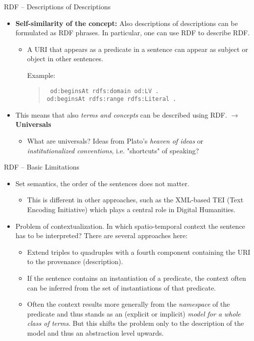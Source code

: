 \documentclass{beamer}
\begin{document}
\begin{frame}{RDF -- Descriptions of Descriptions}
\begin{itemize}
\item \textbf{Self-similarity of the concept:} Also descriptions of
  descriptions can be formulated as RDF phrases. In particular, one can use
  RDF to describe RDF.
  \begin{itemize}
  \item A URI that appears as a predicate in a sentence can appear as subject
    or object in other sentences.
  
    Example:
    \begin{quote}\tt      
      od:beginsAt rdfs:domain od:LV .\\
      od:beginsAt rdfs:range rdfs:Literal .
    \end{quote}
  \end{itemize}
\item This means that also \emph{terms and concepts} can be described using
  RDF. $\to$ \textbf{Universals}
  \begin{itemize}
  \item What are universals? Ideas from Plato's \emph{heaven of ideas} or
    \emph{institutionalized conventions}, i.e. "shortcuts" of speaking? 
  \end{itemize}
\end{itemize}
\end{frame}
\begin{frame}{RDF -- Basic Limitations}
\begin{itemize}
\item Set semantics, the order of the sentences does not matter.
  \begin{itemize}
  \item This is different in other approaches, such as the XML-based TEI (Text
    Encoding Initiative) which plays a central role in Digital Humanities.
  \end{itemize}
\item Problem of contextualization. In which spatio-temporal context the
  sentence has to be interpreted? There are several approaches here:
  \begin{itemize}
  \item Extend triples to quadruples with a fourth component containing the
    URI to the provenance (description).
  \item If the sentence contains an instantiation of a predicate, the context
    often can be inferred from the set of instantiations of that predicate.
  \item Often the context results more generally from the \emph{namespace} of
    the predicate and thus stands as an (explicit or implicit) \emph{model for
      a whole class of terms}.  But this shifts the problem only to the
    description of the model and thus an abstraction level upwards.
  \end{itemize}
\end{itemize}
\end{frame}
\end{document}
